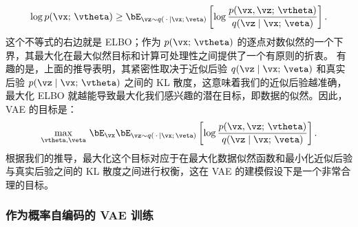 \documentclass[../../book-main_zh.tex]{subfiles}
\begin{document}
\begin{equation*}
\log p(\vx;\, \vtheta)
\geq
\bE_{\vz \sim q(\,\cdot\, \mid \vx ;\, \veta)} \left[
  \log \frac{p(\vx, \vz;\, \vtheta)}{q(\vz \mid \vx;\, \veta)}
\right].
\end{equation*}
这个不等式的右边就是 ELBO；作为 $p(\vx;\, \vtheta)$ 的逐点对数似然的一个下界，其最大化在最大似然目标和计算可处理性之间提供了一个有原则的折衷。
有趣的是，上面的推导表明，其紧密性取决于近似后验 $q(\vz \mid \vx;\, \veta)$ 和真实后验 $p(\vz \mid \vx;\, \vtheta)$ 之间的 KL 散度，这意味着我们的近似后验越准确，最大化 ELBO 就越能导致最大化我们感兴趣的潜在目标，即数据的似然。因此，VAE 的目标是：
\begin{equation}\label{eq:elbo-objective}
\max_{\vtheta, \veta}\,
\bE_{\vx}
\bE_{\vz \sim q(\,\cdot\, \mid \vx ;\, \veta)} \left[
  \log \frac{p(\vx, \vz;\, \vtheta)}{q(\vz \mid \vx;\, \veta)}
\right].
\end{equation}
根据我们的推导，最大化这个目标对应于在最大化数据似然函数和最小化近似后验与真实后验之间的 KL 散度之间进行权衡，这在 VAE 的建模假设下是一个非常合理的目标。

\subsubsection{作为概率自编码的 VAE 训练}
\end{document}
